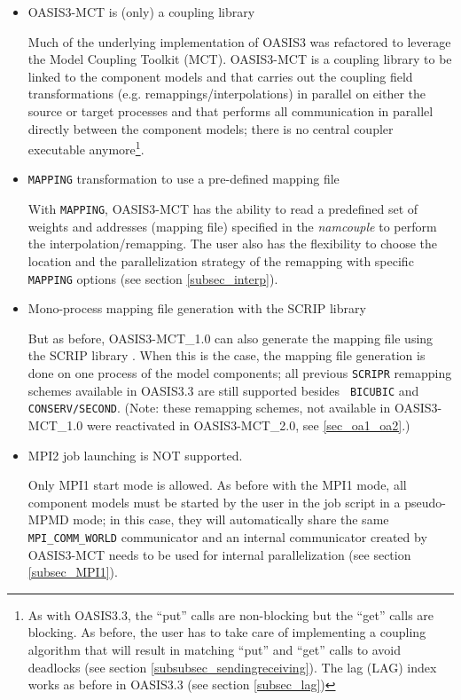 \begin{itemize}
\item OASIS3-MCT is (only) a coupling library

Much of the underlying implementation of OASIS3 was refactored to
leverage the Model Coupling Toolkit (MCT). OASIS3-MCT is a coupling
library to be linked to the component models and that
carries out the coupling field transformations (e.g. remappings/interpolations)
in parallel on either the source or target processes and that performs
all communication in parallel directly between the component models; there
is no central coupler executable anymore\footnote{As with OASIS3.3,
  the ``put'' calls are non-blocking but the ``get'' calls are
blocking. As before, the user has to take care of implementing a coupling
algorithm that will result in matching ``put'' and ``get'' calls to
avoid deadlocks (see section \ref{subsubsec_sendingreceiving}). The lag (LAG) index works as
before in OASIS3.3 (see section \ref{subsec_lag})}.

\item {\tt MAPPING} transformation to use a pre-defined mapping file

With {\tt MAPPING}, OASIS3-MCT has the ability to read a predefined
set of weights and addresses (mapping file) specified in the {\it
  namcouple} to perform the interpolation/remapping. The user also has
the flexibility to choose the location and the parallelization strategy of the
remapping with specific {\tt MAPPING} options (see section \ref{subsec_interp}).

\item Mono-process mapping file generation with the SCRIP library

But as before, OASIS3-MCT\_1.0 can
also generate the mapping file using the SCRIP library
\citep{Jones99}. When this is the case, the mapping file generation is
done on one process of the model components; all previous {\tt SCRIPR} remapping
schemes available in OASIS3.3 are still supported besides {\tt
  BICUBIC} and {\tt CONSERV/SECOND}. (Note: these remapping schemes, not available in OASIS3-MCT\_1.0
  were reactivated in OASIS3-MCT\_2.0, see \ref{sec_oa1_oa2}.)

\item MPI2 job launching is NOT supported.

  Only MPI1 start mode is allowed. As before with the MPI1 mode, all
  component models must be started by the user in the job script in a
  pseudo-MPMD mode; in this case, they will automatically share the
  same {\tt MPI\_COMM\_WORLD} communicator and an internal
  communicator created by OASIS3-MCT needs to be used for internal
  parallelization (see section \ref{subsec_MPI1}).

\end{itemize}

